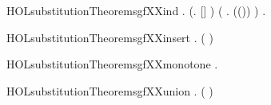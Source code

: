 \newcommand{\HOLsubstitutionTheoremsgfXXim}{\UseVerbatim{HOLsubstitutionTheoremsgfXXim}}
\begin{SaveVerbatim}{HOLsubstitutionTheoremsgfXXind}
\HOLTokenTurnstile{} \HOLSymConst{\HOLTokenForall{}}.
     (\HOLSymConst{\HOLTokenForall{}}.  [] ) \HOLSymConst{\HOLTokenConj{}} (\HOLSymConst{\HOLTokenForall{}}   .    \HOLSymConst{\HOLTokenImp{}}  ((\HOLSymConst{,})\HOLSymConst{::}) ) \HOLSymConst{\HOLTokenImp{}}
     \HOLSymConst{\HOLTokenForall{}} .   
\end{SaveVerbatim}
\newcommand{\HOLsubstitutionTheoremsgfXXind}{\UseVerbatim{HOLsubstitutionTheoremsgfXXind}}
\begin{SaveVerbatim}{HOLsubstitutionTheoremsgfXXinsert}
\HOLTokenTurnstile{} \HOLSymConst{\HOLTokenForall{}}  .   (  ) \HOLSymConst{=}       
\end{SaveVerbatim}
\newcommand{\HOLsubstitutionTheoremsgfXXinsert}{\UseVerbatim{HOLsubstitutionTheoremsgfXXinsert}}
\begin{SaveVerbatim}{HOLsubstitutionTheoremsgfXXmonotone}
\HOLTokenTurnstile{} \HOLSymConst{\HOLTokenForall{}}  .  \HOLConst{\HOLTokenSubset{}}  \HOLSymConst{\HOLTokenImp{}}    \HOLConst{\HOLTokenSubset{}}   
\end{SaveVerbatim}
\newcommand{\HOLsubstitutionTheoremsgfXXmonotone}{\UseVerbatim{HOLsubstitutionTheoremsgfXXmonotone}}
\begin{SaveVerbatim}{HOLsubstitutionTheoremsgfXXunion}
\HOLTokenTurnstile{} \HOLSymConst{\HOLTokenForall{}}  .   ( \HOLConst{\HOLTokenUnion{}} ) \HOLSymConst{=}    \HOLConst{\HOLTokenUnion{}}   
\end{SaveVerbatim}
